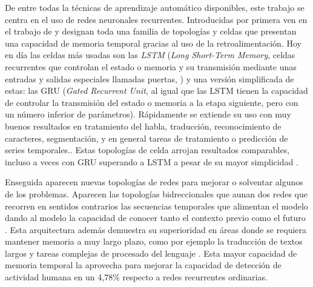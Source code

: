 De entre todas la técnicas de aprendizaje automático disponibles, este trabajo se centra en el uso de redes neuronales recurrentes. Introducidas por primera ven en el trabajo de  y designan toda una familia de topologías y celdas que presentan una capacidad de memoria temporal gracias al uso de la retroalimentación. Hoy en día las celdas más usadas son las \textit{LSTM} (\textit{Long Short-Term Memory}, celdas recurrentes que controlan el estado o memoria y su transmisión mediante unas entradas y salidas especiales llamadas puertas, ) y una versión simplificada de estas: las GRU (\textit{Gated Recurrent Unit}, al igual que las LSTM tienen la capacidad de controlar la transmisión del estado o memoria a la etapa siguiente, pero con un número inferior de parámetros). Rápidamente se extiende su uso con muy buenos resultados en tratamiento del habla, traducción, reconocimiento de caracteres, segmentación, y en general tareas de tratamiento o predicción de series temporales.. Estas topologías de celda arrojan resultados comparables, incluso a veces con GRU superando a LSTM a pesar de su mayor simplicidad \cite{Chung2014,Su2018}.

Enseguida aparecen nuevas topologías de redes para mejorar o solventar algunos de los problemas. Aparecen las topologías bidreccionales que aunan dos redes que recorren en sentidos contrarios las secuencias temporales que alimentan el modelo dando al modelo la capacidad de conocer tanto el contexto previo como el futuro \cite{Schuster1997}. Esta arquitectura además demuestra su superioridad en áreas donde se requiera mantener memoria a muy largo plazo, como por ejemplo la traducción de textos largos y tareas complejas de procesado del lenguaje \cite{Su2018}. Esta mayor capacidad de memoria temporal la aprovecha  para mejorar la capacidad de detección de actividad humana en un 4,78\% respecto a redes recurrentes ordinarias.


